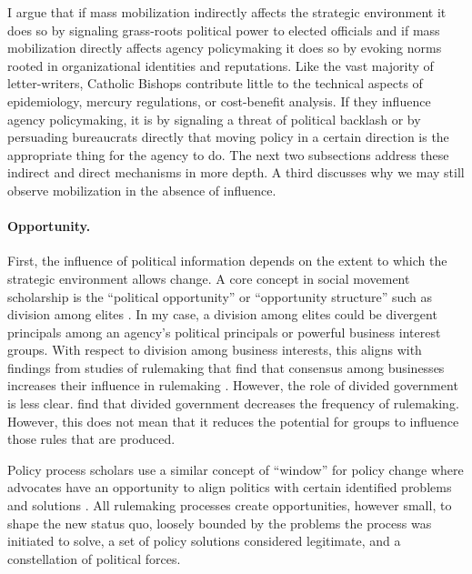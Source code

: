 I argue that if mass mobilization indirectly affects the strategic environment it does so by signaling grass-roots political power to elected officials and if mass mobilization directly affects agency policymaking it does so by evoking norms rooted in organizational identities and reputations. 
Like the vast majority of letter-writers, Catholic Bishops contribute little to the technical aspects of epidemiology, mercury regulations, or cost-benefit analysis. If they influence agency policymaking, it is by signaling a threat of political backlash or by persuading bureaucrats directly that moving policy in a certain direction is the appropriate thing for the agency to do. 
The next two subsections address these indirect and direct mechanisms in more depth. A third discusses why we may still observe mobilization in the absence of influence. 




\paragraph{Opportunity.} First, the influence of political information depends on the extent to which the strategic environment allows change. A core concept in social movement scholarship is the ``political opportunity'' or ``opportunity structure'' \citep{Mcadam2017} such as division among elites \citep{Tarrow1994}. In my case, a division among elites could be divergent principals among an agency's political principals or powerful business interest groups. With respect to division among business interests, this aligns with findings from studies of rulemaking that find that consensus among businesses increases their influence in rulemaking \citep{Yackee2006JOP, Nelson2012}. However, the role of divided government is less clear. \citet{Yackee2009RegGov} find that divided government decreases the frequency of rulemaking. However, this does not mean that it reduces the potential for groups to influence those rules that are produced.

Policy process scholars use a similar concept of ``window'' for policy change where advocates have an opportunity to align politics with certain identified problems and solutions  \citep{Kingdon1984}. All rulemaking processes create opportunities, however small, to shape the new status quo, loosely bounded by the problems the process was initiated to solve, a set of policy solutions considered legitimate, and a constellation of political forces.

